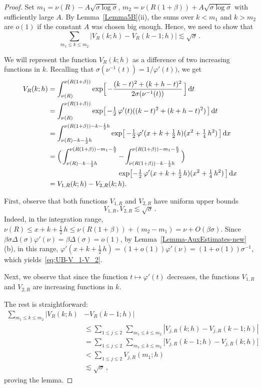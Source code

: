 \documentclass[11pt]{amsart}
\numberwithin{equation}{section}
\begin{document}
\begin{proof}
Set $m_1 = \nu(R) - A\sqrt{\sigma\log\sigma}$, $m_2 = \nu(R(1+\beta)) +A\sqrt{\sigma\log\sigma}$
with sufficiently large $A$. By Lemma~\ref{Lemma5B}(ii), the sums over $k<m_1$ and
$k>m_2$
are $o(1)$ if the constant $A$ was chosen big enough. Hence, we need to show that
\[ \sum_{m_1 \le k \le m_2} |V_R(k; h) - V_R(k-1; h)| \lesssim \sqrt{\sigma}\,. \]

We will represent the function $V_R(k; h)$ as a difference of two increasing
functions in $k$. Recalling that $\sigma (\nu^{-1}(t)) = 1/\varphi'(t))$,
we get
\begin{align*}
V_R(k; h) &= \int_{\nu(R)}^{\nu(R(1+\beta))}
\exp\Bigl[\,
- \frac{(k-t)^2+(k+h-t)^2}{2\sigma(\nu^{-1}(t))}
\,\Bigr]\, {\rm d}t \\
&= \int_{\nu(R)}^{\nu(R(1+\beta))}
\exp\bigl[\,
- \tfrac12\, \varphi'(t)((k-t)^2+(k+h-t)^2)
\,\bigr]\, {\rm d}t \\
&= \int_{\nu(R)-k-\frac12 h}^{\nu(R(1+\beta))-k-\frac12 h}
\exp\bigl[\,
- \tfrac12\, \varphi'(x+k+\tfrac12\, h)(x^2 + \tfrac14\, h^2)
\,\bigr]\, {\rm d}x \\
&= \Bigl(\, \int_{\nu(R)-k-\frac12 h}^{\nu(R(1+\beta))-m_1 -\frac{h}2}
- \int_{\nu(R(1+\beta))-k-\frac12 h}^{\nu(R(1+\beta))-m_1 -\frac{h}2} \,\Bigr)\\
&\qquad\qquad\qquad\qquad\qquad\exp\bigl[
- \tfrac12\, \varphi'(x+k+\tfrac12\, h)(x^2 + \tfrac14\, h^2)
\,\bigr]\, {\rm d}x \\
&= V_{1, R}(k; h) - V_{2, R}(k; h).
\end{align*}

First, observe that both functions $V_{1, R}$ and $V_{2, R}$ have uniform upper bounds
\begin{equation}\label{eq:UB-V_1-V_2}
V_{1, R}, V_{2, R} \lesssim \sqrt{\sigma}\,.
\end{equation}
Indeed, in the integration range, $\nu(R) \le x+k+\tfrac12\, h \le \nu(R(1+\beta)) + (m_2-m_1)
= \nu + O(\beta\sigma)$. Since $\beta\sigma\Delta(\sigma) \varphi'(\nu) =
\beta \Delta(\sigma) = o(1)$, by Lemma~\ref{Lemma-AuxEstimates-new}(b), in this range,
$\varphi'(x+k+\tfrac12\, h) = (1+o(1))\varphi'(\nu) = (1+o(1))\sigma^{-1}$,
which yields~\eqref{eq:UB-V_1-V_2}.

Next, we observe that since the function $t\mapsto \varphi'(t)$ decreases,
the functions $V_{1, R}$ and $V_{2, R}$ are increasing functions in $k$.

The rest is straightforward:
\begin{align*}
 \sum_{m_1 \le k \le m_2}
|V_R(k; h) &- V_R(k-1; h)| \\
& 
\le
\sum_{1\le j\le 2}\,\sum_{m_1 \le k \le m_2}
|V_{j, R}(k; h) - V_{j, R}(k-1; h)|
\\
& 
= \sum_{1\le j\le 2}\,\sum_{m_1 \le k \le m_2}
\bigl[ V_{j, R}(k-1; h) - V_{j, R}(k; h) \bigr]
\\
&   < \sum_{1\le j\le 2}V_{j, R}(m_1; h) 
\\
&  \lesssim \sqrt{\sigma}\,,
\end{align*}
proving the lemma.
\end{proof}
\end{document}
